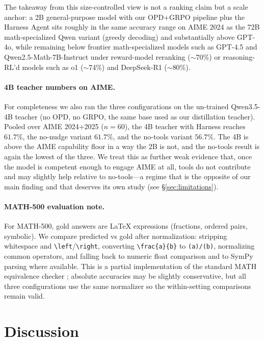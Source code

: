 \documentclass[10pt]{article}
\begin{document}
The takeaway from this size-controlled view is not a ranking claim but a scale anchor: a 2B general-purpose model with our OPD+GRPO pipeline plus the Harness Agent sits roughly in the same accuracy range on AIME 2024 as the 72B math-specialized Qwen variant (greedy decoding) and substantially above GPT-4o, while remaining below frontier math-specialized models such as GPT-4.5 and Qwen2.5-Math-7B-Instruct under reward-model reranking ($\sim$70\%) or reasoning-RL'd models such as o1 ($\sim$74\%) and DeepSeek-R1 ($\sim$80\%).

\paragraph{4B teacher numbers on AIME.} For completeness we also ran the three configurations on the un-trained Qwen3.5-4B teacher (no OPD, no GRPO, the same base used as our distillation teacher). Pooled over AIME 2024+2025 ($n{=}60$), the 4B teacher with Harness reaches $61.7\%$, the no-nudge variant $61.7\%$, and the no-tools variant $56.7\%$. The 4B is above the AIME capability floor in a way the 2B is not, and the no-tools result is again the lowest of the three. We treat this as further weak evidence that, once the model is competent enough to engage AIME at all, tools do not contribute and may slightly help relative to no-tools---a regime that is the opposite of our main finding and that deserves its own study (see \S\ref{sec:limitations}).

\paragraph{MATH-500 evaluation note.} For MATH-500, gold answers are LaTeX expressions (fractions, ordered pairs, symbolic). We compare predicted vs gold after normalization: stripping whitespace and \texttt{\textbackslash left}/\texttt{\textbackslash right}, converting \texttt{\textbackslash frac\{a\}\{b\}} to \texttt{(a)/(b)}, normalizing common operators, and falling back to numeric float comparison and to SymPy parsing where available. This is a partial implementation of the standard MATH equivalence checker \citep{lewkowycz2022solving}; absolute accuracies may be slightly conservative, but all three configurations use the same normalizer so the within-setting comparisons remain valid.

\section{Discussion}
\label{sec:discussion}
\end{document}
